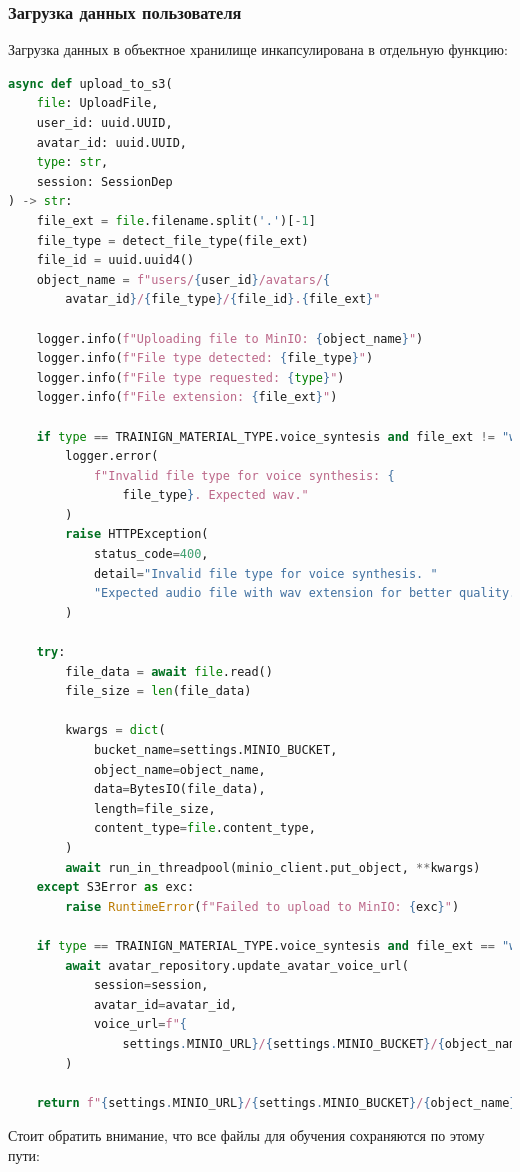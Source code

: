 \subsubsection{Загрузка данных пользователя}
Загрузка данных в объектное хранилище инкапсулирована в отдельную функцию: 
\begin{lstlisting}[language=Python, numbers=none, frame=none]
async def upload_to_s3(
    file: UploadFile,
    user_id: uuid.UUID,
    avatar_id: uuid.UUID,
    type: str,
    session: SessionDep
) -> str:
    file_ext = file.filename.split('.')[-1]
    file_type = detect_file_type(file_ext)
    file_id = uuid.uuid4()
    object_name = f"users/{user_id}/avatars/{
        avatar_id}/{file_type}/{file_id}.{file_ext}"

    logger.info(f"Uploading file to MinIO: {object_name}")
    logger.info(f"File type detected: {file_type}")
    logger.info(f"File type requested: {type}")
    logger.info(f"File extension: {file_ext}")

    if type == TRAINIGN_MATERIAL_TYPE.voice_syntesis and file_ext != "wav":
        logger.error(
            f"Invalid file type for voice synthesis: {
                file_type}. Expected wav."
        )
        raise HTTPException(
            status_code=400,
            detail="Invalid file type for voice synthesis. "
            "Expected audio file with wav extension for better quality."
        )

    try:
        file_data = await file.read()
        file_size = len(file_data)

        kwargs = dict(
            bucket_name=settings.MINIO_BUCKET,
            object_name=object_name,
            data=BytesIO(file_data),
            length=file_size,
            content_type=file.content_type,
        )
        await run_in_threadpool(minio_client.put_object, **kwargs)
    except S3Error as exc:
        raise RuntimeError(f"Failed to upload to MinIO: {exc}")

    if type == TRAINIGN_MATERIAL_TYPE.voice_syntesis and file_ext == "wav":
        await avatar_repository.update_avatar_voice_url(
            session=session,
            avatar_id=avatar_id,
            voice_url=f"{
                settings.MINIO_URL}/{settings.MINIO_BUCKET}/{object_name}"
        )

    return f"{settings.MINIO_URL}/{settings.MINIO_BUCKET}/{object_name}"
\end{lstlisting}
Стоит обратить внимание, что все файлы для обучения сохраняются по этому пути:\newline
